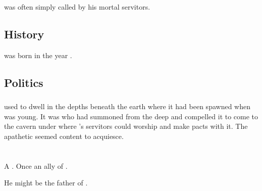 \Ishtacca was often simply called  by his mortal servitors. 









\subsection{History}
\Ishtacca was born in the year .









\subsection{Politics}





\subsubsection{\Ubloth}
 used to dwell in the depths beneath the earth where it had been spawned when \Miith was young. 
It was \Ishtacca who had summoned \Ubloth from the deep and compelled it to come to the cavern under \Yormis where \Ishtacca's servitors could worship \Ubloth and make pacts with it. 
The apathetic  seemed content to acquiesce.
















\section{\Iurzmacul}
\index{\Iurzmacul}
A \nagalord. 
Once an ally of \TyarithXserasshana. 

He might be the father of .



















